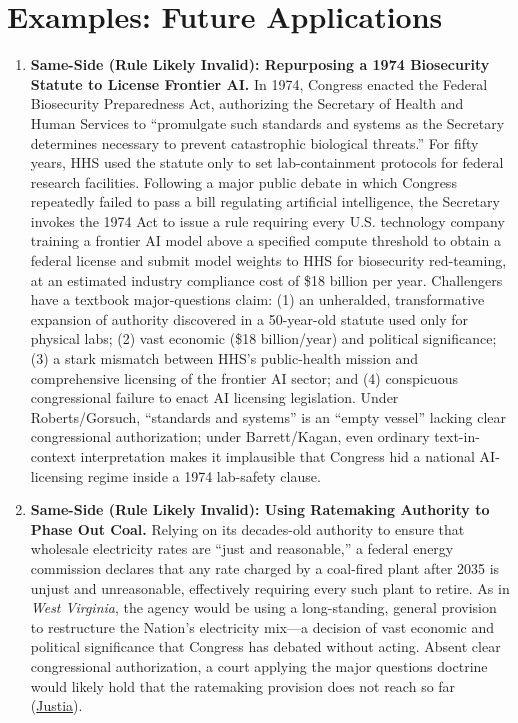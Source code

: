 \documentclass[12pt]{article}
\begin{document}
\section{Examples: Future Applications}
\begin{enumerate}

\item \textbf{Same-Side (Rule Likely Invalid): Repurposing a 1974 Biosecurity Statute to License Frontier AI.} In 1974, Congress enacted the Federal Biosecurity Preparedness Act, authorizing the Secretary of Health and Human Services to ``promulgate such standards and systems as the Secretary determines necessary to prevent catastrophic biological threats.'' For fifty years, HHS used the statute only to set lab-containment protocols for federal research facilities. Following a major public debate in which Congress repeatedly failed to pass a bill regulating artificial intelligence, the Secretary invokes the 1974 Act to issue a rule requiring every U.S. technology company training a frontier AI model above a specified compute threshold to obtain a federal license and submit model weights to HHS for biosecurity red-teaming, at an estimated industry compliance cost of \$18 billion per year. Challengers have a textbook major-questions claim: (1) an unheralded, transformative expansion of authority discovered in a 50-year-old statute used only for physical labs; (2) vast economic (\$18 billion/year) and political significance; (3) a stark mismatch between HHS's public-health mission and comprehensive licensing of the frontier AI sector; and (4) conspicuous congressional failure to enact AI licensing legislation. Under Roberts/Gorsuch, ``standards and systems'' is an ``empty vessel'' lacking clear congressional authorization; under Barrett/Kagan, even ordinary text-in-context interpretation makes it implausible that Congress hid a national AI-licensing regime inside a 1974 lab-safety clause.

\item \textbf{Same-Side (Rule Likely Invalid): Using Ratemaking Authority to Phase Out Coal.} Relying on its decades-old authority to ensure that wholesale electricity rates are ``just and reasonable,'' a federal energy commission declares that any rate charged by a coal-fired plant after 2035 is unjust and unreasonable, effectively requiring every such plant to retire. As in \textit{West Virginia}, the agency would be using a long-standing, general provision to restructure the Nation's electricity mix---a decision of vast economic and political significance that Congress has debated without acting. Absent clear congressional authorization, a court applying the major questions doctrine would likely hold that the ratemaking provision does not reach so far (\href{https://supreme.justia.com/cases/federal/us/597/20-1530/}{Justia}).


\end{enumerate}
\end{document}
